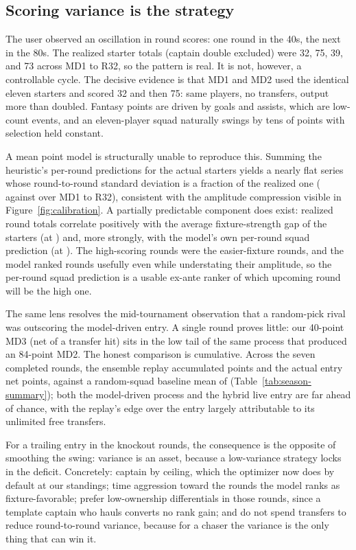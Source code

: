 \subsection{Scoring variance is the strategy}
\label{sec:analysis-variance}

The user observed an oscillation in round scores: one round in the 40s,
the next in the 80s. The realized starter totals (captain double
excluded) were 32, 75, 39, and 73 across MD1 to R32, so the pattern is
real. It is not, however, a controllable cycle. The decisive evidence
is that MD1 and MD2 used the identical eleven starters and scored 32
and then 75: same players, no transfers, output more than doubled.
Fantasy points are driven by goals and assists, which are low-count
events, and an eleven-player squad naturally swings by tens of points
with selection held constant.

A mean point model is structurally unable to reproduce this. Summing
the heuristic's per-round predictions for the actual starters yields a
nearly flat series whose round-to-round standard deviation is a
fraction of the realized one (\RoundStdPredicted{} against
\RoundStdRealized{} over MD1 to R32), consistent with the
amplitude compression visible in Figure~\ref{fig:calibration}. A
partially predictable component does exist: realized round totals
correlate positively with the average fixture-strength gap of the
starters (at \CorrFixtureGap{}) and, more strongly, with the model's
own per-round squad prediction (at \CorrModelPrediction{}).
The high-scoring rounds were the easier-fixture rounds, and the model
ranked rounds usefully even while understating their amplitude, so the
per-round squad prediction is a usable ex-ante ranker of which upcoming
round will be the high one.

The same lens resolves the mid-tournament observation that a
random-pick rival was outscoring the model-driven entry. A single round
proves little: our 40-point MD3 (net of a transfer hit) sits in the low
tail of the same process that produced an 84-point MD2. The honest
comparison is cumulative. Across the seven completed rounds, the
ensemble replay accumulated \TotalEnsemble{} points and the actual
entry \TotalUserActualNet{} net points, against a random-squad
baseline mean of \TotalRandomBaselineMean{}
(Table~\ref{tab:season-summary}); both the model-driven process and
the hybrid live entry are far ahead of chance, with the replay's
edge over the entry largely attributable to its unlimited free
transfers.

For a trailing entry in the knockout rounds, the consequence is the
opposite of smoothing the swing: variance is an asset, because a
low-variance strategy locks in the deficit. Concretely: captain by
ceiling, which the optimizer now does by default at our standings;
time aggression toward the rounds the model ranks as fixture-favorable;
prefer low-ownership differentials in those rounds, since a template
captain who hauls converts no rank gain; and do not spend transfers to
reduce round-to-round variance, because for a chaser the variance is
the only thing that can win it.

